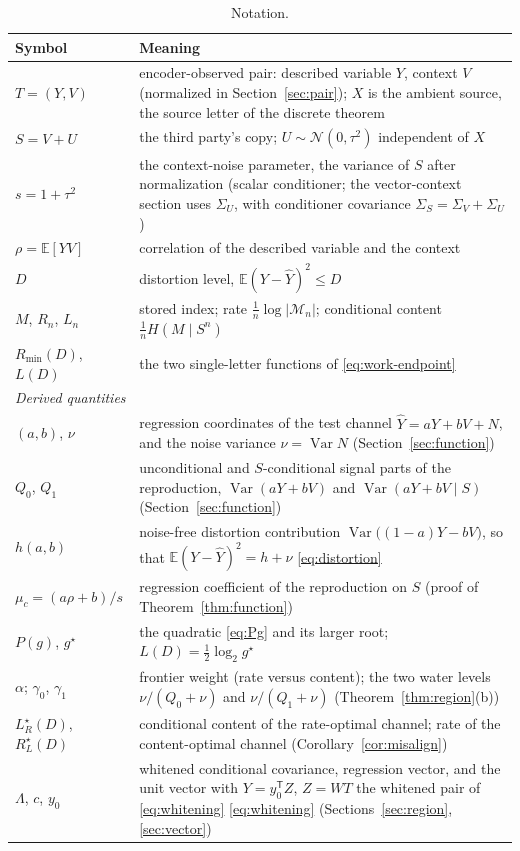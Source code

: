 \documentclass[11pt,onecolumn]{IEEEtran}
\newcommand{\E}{\mathbb{E}}
\newcommand{\hY}{\widehat{Y}}
\newcommand{\LRs}{L_{R}^{\star}}
\newcommand{\RLs}{R_{L}^{\star}}
\begin{document}
\begin{table}[!t]
\caption{Notation.}
\label{tab:notation}
\centering
\footnotesize
\begin{tabular}{p{1.35in}p{4.55in}}
\hline
Symbol & Meaning\\
\hline
$T=(Y,V)$ & encoder-observed pair: described variable $Y$, context $V$
(normalized in Section~\ref{sec:pair}); $X$ is the ambient source, the
source letter of the discrete theorem\\
$S=V+U$ & the third party's copy; $U\sim\mathcal N(0,\tau^2)$
independent of $X$\\
$s=1+\tau^2$ & the context-noise parameter, the variance of $S$ after
normalization (scalar conditioner;
the vector-context section uses $\Sigma_U$, with conditioner covariance
$\Sigma_S=\Sigma_V+\Sigma_U$)\\
$\rho=\E[YV]$ & correlation of the described variable and the context\\
$D$ & distortion level, $\E(Y-\hY)^2\le D$\\
$M$, $R_n$, $L_n$ & stored index; rate $\tfrac1n\log|\mathcal M_n|$;
conditional content $\tfrac1n H(M\mid S^n)$\\
$R_{\min}(D)$, $L(D)$ & the two single-letter functions of
\eqref{eq:work-endpoint}\\
\hline
\multicolumn{2}{l}{\emph{Derived quantities}}\\
\hline
$(a,b)$, $\nu$ & regression coordinates of the test channel
$\hY=aY+bV+N$, and the noise variance $\nu=\operatorname{Var}N$
(Section~\ref{sec:function})\\
$Q_0$, $Q_1$ & unconditional and $S$-conditional signal parts of the
reproduction, $\operatorname{Var}(aY+bV)$ and
$\operatorname{Var}(aY+bV\mid S)$ (Section~\ref{sec:function})\\
$h(a,b)$ & noise-free distortion contribution
$\operatorname{Var}\bigl((1-a)Y-bV\bigr)$, so that
$\E(Y-\hY)^2=h+\nu$ \eqref{eq:distortion}\\
$\mu_c=(a\rho+b)/s$ & regression coefficient of the reproduction on
$S$ (proof of Theorem~\ref{thm:function})\\
$P(g)$, $g^\star$ & the quadratic \eqref{eq:Pg} and its larger root;
$L(D)=\tfrac12\log_2 g^\star$\\
$\alpha$; $\gamma_0$, $\gamma_1$ & frontier weight (rate versus
content); the two water levels $\nu/(Q_0+\nu)$ and $\nu/(Q_1+\nu)$
(Theorem~\ref{thm:region}(b))\\
$\LRs(D)$, $\RLs(D)$ & conditional content of the rate-optimal channel;
rate of the content-optimal channel (Corollary~\ref{cor:misalign})\\
$\Lambda$, $c$, $y_0$ & whitened conditional covariance, regression
vector, and the unit vector with $Y=y_0^{\mathsf T}Z$, $Z=WT$ the whitened pair of \eqref{eq:whitening}
\eqref{eq:whitening} (Sections~\ref{sec:region}, \ref{sec:vector})\\
\hline
\end{tabular}
\end{table}
\end{document}
